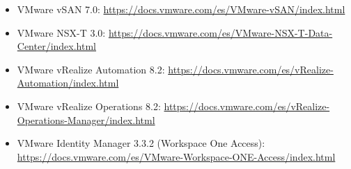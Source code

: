 \begin{description}
\begin{itemize}
            \item VMware vSAN 7.0: \url{https://docs.vmware.com/es/VMware-vSAN/index.html}
            \item VMware NSX-T 3.0: \url{https://docs.vmware.com/es/VMware-NSX-T-Data-Center/index.html}
            \item VMware vRealize Automation 8.2: \url{https://docs.vmware.com/es/vRealize-Automation/index.html}
            \item VMware vRealize Operations 8.2: \url{https://docs.vmware.com/es/vRealize-Operations-Manager/index.html}
            \item VMware Identity Manager 3.3.2 (Workspace One Access): \url{https://docs.vmware.com/es/VMware-Workspace-ONE-Access/index.html}
        \end{itemize}
\end{description}